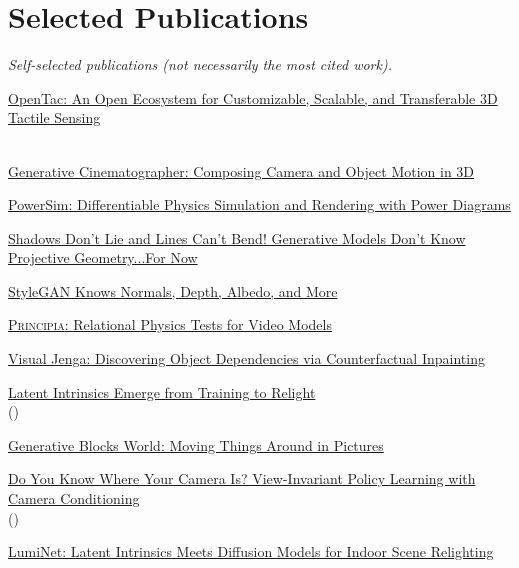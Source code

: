 \section{Selected Publications}
{\color{muted}\itshape Self-selected publications (not necessarily the most cited work).}\par\smallskip
\begin{list2}\setlength{\itemsep}{0pt}
\item \href{https://opentac.github.io/}{OpenTac: An Open Ecosystem for Customizable, Scalable, and Transferable 3D Tactile Sensing}\\[1pt]\,
\item \href{https://generative-cinematographer.github.io/}{Generative Cinematographer: Composing Camera and Object Motion in 3D}\\[1pt]
\item \href{https://power-sim.github.io/}{PowerSim: Differentiable Physics Simulation and Rendering with Power Diagrams}\\[1pt]
\item \href{https://projective-geometry.github.io/}{Shadows Don't Lie and Lines Can't Bend! Generative Models Don't Know Projective Geometry...For Now}\\[1pt]
\item \href{https://arxiv.org/abs/2306.00987}{StyleGAN Knows Normals, Depth, Albedo, and More}\\[1pt]
\item \href{https://principiabench.github.io/}{\textsc{Principia}: Relational Physics Tests for Video Models}\\[1pt]
\item \href{https://visualjenga.github.io/}{Visual Jenga: Discovering Object Dependencies via Counterfactual Inpainting}\\[1pt]
\item \href{https://sites.google.com/uchicago.edu/latent-intrinsic/home}{Latent Intrinsics Emerge from Training to Relight}\\[1pt] ()
\item \href{https://arxiv.org/abs/2506.20703}{Generative Blocks World: Moving Things Around in Pictures}\\[1pt]
\item \href{https://ripl.github.io/know_your_camera/}{Do You Know Where Your Camera Is? View-Invariant Policy Learning with Camera Conditioning}\\[1pt] ()
\item \href{https://luminet-relight.github.io/}{LumiNet: Latent Intrinsics Meets Diffusion Models for Indoor Scene Relighting}\\[1pt]
\end{list2}
\iffull
